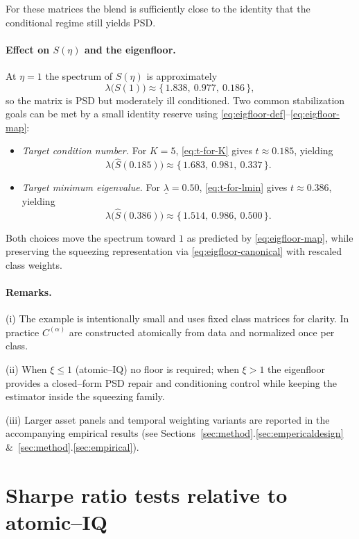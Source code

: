 \documentclass[12pt,letterpaper]{article}
\begin{document}
For these matrices the blend is sufficiently close to the identity that the conditional regime still yields PSD.

\paragraph{Effect on \(S(\eta)\) and the eigenfloor.}
At \(\eta=1\) the spectrum of \(S(\eta)\) is approximately
\[
\lambda\big(S(1)\big)\approx \{\,1.838,\ 0.977,\ 0.186\,\},
\]
so the matrix is PSD but moderately ill conditioned.
Two common stabilization goals can be met by a small identity reserve using \eqref{eq:eigfloor-def}--\eqref{eq:eigfloor-map}:

\begin{itemize}
\item \emph{Target condition number.} For \(K=5\), \eqref{eq:t-for-K} gives \(t\approx 0.185\), yielding
\[
\lambda\big(\widehat S(0.185)\big)\approx \{\,1.683,\ 0.981,\ 0.337\,\}.
\]
\item \emph{Target minimum eigenvalue.} For \(\underline{\lambda}=0.50\), \eqref{eq:t-for-lmin} gives \(t\approx 0.386\), yielding
\[
\lambda\big(\widehat S(0.386)\big)\approx \{\,1.514,\ 0.986,\ 0.500\,\}.
\]
\end{itemize}

Both choices move the spectrum toward \(1\) as predicted by \eqref{eq:eigfloor-map}, while preserving the squeezing representation via \eqref{eq:eigfloor-canonical} with rescaled class weights.

\paragraph{Remarks.}
(i) The example is intentionally small and uses fixed class matrices for clarity. In practice \(C^{(\alpha)}\) are constructed atomically from data and normalized once per class.  

(ii) When \(\xi\le 1\) (atomic--IQ) no floor is required; when \(\xi>1\) the eigenfloor provides a closed--form PSD repair and conditioning control while keeping the estimator inside the squeezing family.  

(iii) Larger asset panels and temporal weighting variants are reported in the accompanying empirical results (see Sections~\ref{sec:method}.\ref{sec:empericaldesign} \&~\ref{sec:method}.\ref{sec:empirical}).


\section{Sharpe ratio tests relative to atomic--IQ}
\label{sec:SharpeRatioTests}
\end{document}
